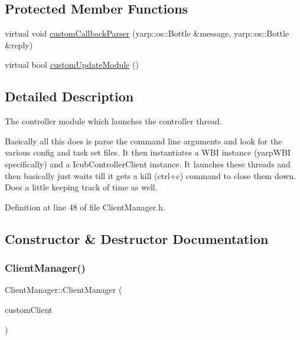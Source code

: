 \subsection*{Protected Member Functions}
\begin{DoxyCompactItemize}
\item 
virtual void \hyperlink{classocra__recipes_1_1ClientManager_ab81a0bc48b6ac66b97988ef836df3cd6}{custom\+Callback\+Parser} (yarp\+::os\+::\+Bottle \&message, yarp\+::os\+::\+Bottle \&reply)
\item 
virtual bool \hyperlink{classocra__recipes_1_1ClientManager_a51e6fd902ad96b27c2c976305f7306fd}{custom\+Update\+Module} ()
\end{DoxyCompactItemize}


\subsection{Detailed Description}
The controller module which launches the controller thread. 

Basically all this does is parse the command line arguments and look for the various config and task set files. It then instantiates a W\+BI instance (yarp\+W\+BI specifically) and a Icub\+Controller\+Client instance. It launches these threads and then basically just waits till it gets a kill (ctrl+c) command to close them down. Does a little keeping track of time as well. 

Definition at line 48 of file Client\+Manager.\+h.



\subsection{Constructor \& Destructor Documentation}
\hypertarget{classocra__recipes_1_1ClientManager_ad5e77797451b303bf063ca6c1ebf8307}{}\label{classocra__recipes_1_1ClientManager_ad5e77797451b303bf063ca6c1ebf8307} 
\subsubsection{\texorpdfstring{Client\+Manager()}{ClientManager()}}
{\footnotesize\ttfamily Client\+Manager\+::\+Client\+Manager (\begin{DoxyParamCaption}\item[{std\+::shared\+\_\+ptr$<$ \hyperlink{classocra__recipes_1_1ControllerClient}{Controller\+Client} $>$}]{custom\+Client }\end{DoxyParamCaption})}

